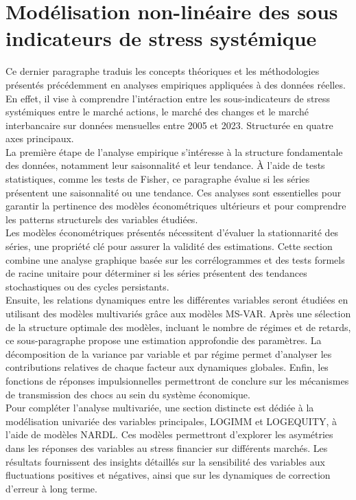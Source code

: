 \section{Modélisation non-linéaire des sous indicateurs de stress systémique}

Ce dernier paragraphe traduis les concepts théoriques et les méthodologies présentés précédemment en analyses empiriques appliquées à des données réelles. En effet, il vise à comprendre l'intéraction entre les sous-indicateurs de stress systémiques entre le marché actions, le marché des changes et le marché interbancaire sur données mensuelles entre 2005 et 2023. Structurée en quatre axes principaux.\\

La première étape de l’analyse empirique s’intéresse à la structure fondamentale des données, notamment leur saisonnalité et leur tendance. À l’aide de tests statistiques, comme les tests de Fisher, ce paragraphe évalue si les séries présentent une saisonnalité ou une tendance. Ces analyses sont essentielles pour garantir la pertinence des modèles économétriques ultérieurs et pour comprendre les patterns structurels des variables étudiées.\\

Les modèles économétriques présentés nécessitent d’évaluer la stationnarité des séries, une propriété clé pour assurer la validité des estimations. Cette section combine une analyse graphique basée sur les corrélogrammes et des tests formels de racine unitaire pour déterminer si les séries présentent des tendances stochastiques ou des cycles persistants.\\

Ensuite, les relations dynamiques entre les différentes variables seront étudiées en utilisant des modèles multivariés grâce aux modèles MS-VAR. Après une sélection de la structure optimale des modèles, incluant le nombre de régimes et de retards, ce sous-paragraphe propose une estimation approfondie des paramètres. La décomposition de la variance par variable et par régime permet d’analyser les contributions relatives de chaque facteur aux dynamiques globales. Enfin, les fonctions de réponses impulsionnelles permettront de conclure sur les mécanismes de transmission des chocs au sein du système économique.\\

Pour compléter l’analyse multivariée, une section distincte est dédiée à la modélisation univariée des variables principales, LOGIMM et LOGEQUITY, à l’aide de modèles NARDL. Ces modèles permettront d’explorer les asymétries dans les réponses des variables au stress financier sur différents marchés. Les résultats fournissent des insights détaillés sur la sensibilité des variables aux fluctuations positives et négatives, ainsi que sur les dynamiques de correction d’erreur à long terme.\\

